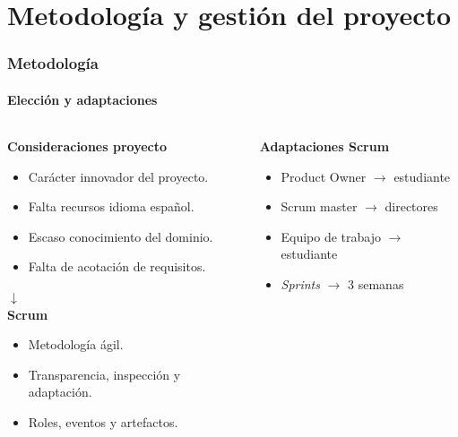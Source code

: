 \documentclass{beamer}
\begin{document}
\section{Metodología y gestión del proyecto}
 \begin{frame}
 	
 	\frametitle{Metodología}
 	\framesubtitle{Elección y adaptaciones}

 		\begin{columns}[T]
 		\hspace{-3cm}

 		\begin{column}{0.8\textwidth}
 			\begin{description}[labelwidth=0.01mm]
				\item \textbf{Consideraciones proyecto}
			 	\begin{itemize}
				\item Carácter innovador del proyecto.
				\item Falta recursos idioma español.
				\item Escaso conocimiento del dominio.
				\item Falta de acotación de requisitos.
			 	\end{itemize}
			 	\pause
 				\hspace{3cm}$\downarrow$ \\
		 		\textbf{Scrum}
	 	 		\begin{itemize}
			 	 	\item Metodología ágil.
			 		\item Transparencia, inspección y adaptación.
			 		\item Roles, eventos y artefactos.
		 		\end{itemize}
			\end{description}
		 \end{column}
	 	\pause
	 	\hspace{-3.5cm}
		 \begin{column}{0.8\textwidth}
		 	\begin{description}[labelwidth=0.01mm]
		 		\item \textbf{Adaptaciones Scrum} 			 	\pause
		 		\begin{itemize}
		 			\item  Product Owner $\rightarrow$ estudiante
		 			\item Scrum master $\rightarrow$ directores
		 			\item  Equipo de trabajo $\rightarrow$ estudiante \pause
		 			\item \textit{Sprints} $\rightarrow$ 3 semanas

\end{itemize}
\end{description}
\end{column}
\end{columns}
\end{frame}
\end{document}
